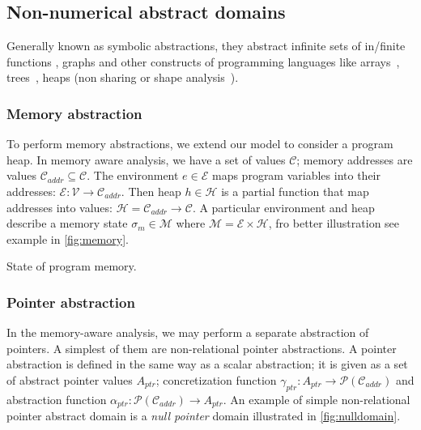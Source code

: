 \subsection{Non-numerical abstract domains}

Generally known as symbolic abstractions, they abstract infinite sets of
in/finite functions \cite{Cousot14}, graphs and other constructs of programming languages like
arrays~\cite{Cousot2011p}, trees~\cite{Mauborgne2000}, heaps (non sharing
\cite{Cousot1977static, Cousot1977rec} or shape analysis~\cite{Reps2002, Chang2008}).

\subsubsection{Memory abstraction}

To perform memory abstractions, we extend our model to consider a program heap.
In memory aware analysis, we have a set of values $\mathcal{C}$; memory addresses are
values $\mathcal{C}_{\textit{addr}} \subseteq \mathcal{C}$. The environment $e
\in \mathcal{E}$ maps program variables into their addresses: $\mathcal{E}:\mathcal{V} \rightarrow \mathcal{C}_{\textit{addr}}$.  Then heap $h \in
\mathcal{H}$ is a partial function that map addresses into values: $\mathcal{H}
= \mathcal{C}_{\textit{addr}} \rightarrow \mathcal{C}$.  A particular
environment and heap describe a memory state $\sigma_m \in \mathcal{M}$ where
$\mathcal{M} = \mathcal{E} \times \mathcal{H}$, fro better illustration see
example in \autoref{fig:memory}.

\begin{marginfigure}
\caption{State of program memory.}
\label{fig:memory}
\end{marginfigure}

\subsubsection{Pointer abstraction}

In the memory-aware analysis, we may perform a separate abstraction of
pointers. A simplest of them are non-relational pointer abstractions. A pointer
abstraction is defined in the same way as a scalar abstraction; it is given as
a set of abstract pointer values $A_{\textit{ptr}}$; concretization function
$\gamma_{\textit{ptr}}: A_{\textit{ptr}} \rightarrow
\mathcal{P}(\mathcal{C}_{\textit{addr}})$ and abstraction function
$\alpha_{\textit{ptr}}: \mathcal{P}(\mathcal{C}_{\textit{addr}}) \rightarrow A
_{\textit{ptr}}$. An example of simple non-relational pointer abstract domain
is a \emph{null pointer} domain illustrated in \autoref{fig:nulldomain}.

